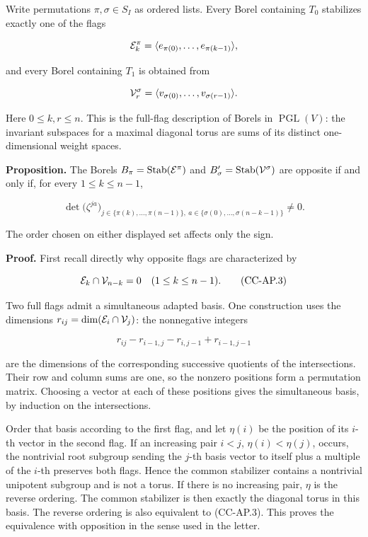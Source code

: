\documentclass[11pt,a4paper]{article}
\theoremstyle{definition}\newtheorem{definition}[theorem]{Definition}
\theoremstyle{remark}\newtheorem{remark}[theorem]{Remark}
\begin{document}
Write permutations \(\pi,\sigma\in S_I\) as ordered lists. Every Borel
containing \(T_0\) stabilizes exactly one of the flags

\[
 {\cal E}^{\pi}_k=\langle e_{\pi(0)},\ldots,e_{\pi(k-1)}\rangle ,
\]

and every Borel containing \(T_1\) is obtained from

\[
 {\cal V}^{\sigma}_r=\langle v_{\sigma(0)},\ldots,v_{\sigma(r-1)}\rangle .
\]

Here \(0\leq k,r\leq n\). This is the full-flag description of Borels in
\(\operatorname{PGL}(V)\): the invariant subspaces for a maximal
diagonal torus are sums of its distinct one-dimensional weight spaces.

\textbf{Proposition.} The Borels
\(B_\pi=\operatorname{Stab}({\cal E}^\pi)\) and
\(B'_\sigma=\operatorname{Stab}({\cal V}^\sigma)\) are opposite if and
only if, for every \(1\leq k\leq n-1\),

\[
 \det\bigl(\zeta^{ja}\bigr)_{
 j\in\{\pi(k),\ldots,\pi(n-1)\},
 \ a\in\{\sigma(0),\ldots,\sigma(n-k-1)\}}\ne0.
 \tag{CC-AP.2}
\]

The order chosen on either displayed set affects only the sign.

\textbf{Proof.} First recall directly why opposite flags are
characterized by

\[
 {\cal E}_k\cap{\cal V}_{n-k}=0
 \quad(1\leq k\leq n-1).
 \tag{CC-AP.3}
\]

Two full flags admit a simultaneous adapted basis. One construction uses
the dimensions \(r_{ij}=\dim({\cal E}_i\cap{\cal V}_j)\): the
nonnegative integers

\[
 r_{ij}-r_{i-1,j}-r_{i,j-1}+r_{i-1,j-1}
\]

are the dimensions of the corresponding successive quotients of the
intersections. Their row and column sums are one, so the nonzero
positions form a permutation matrix. Choosing a vector at each of these
positions gives the simultaneous basis, by induction on the
intersections.

Order that basis according to the first flag, and let \(\eta(i)\) be the
position of its \(i\)-th vector in the second flag. If an increasing
pair \(i<j\), \(\eta(i)<\eta(j)\), occurs, the nontrivial root subgroup
sending the \(j\)-th basis vector to itself plus a multiple of the
\(i\)-th preserves both flags. Hence the common stabilizer contains a
nontrivial unipotent subgroup and is not a torus. If there is no
increasing pair, \(\eta\) is the reverse ordering. The common stabilizer
is then exactly the diagonal torus in this basis. The reverse ordering
is also equivalent to (CC-AP.3). This proves the equivalence with
opposition in the sense used in the letter.
\end{document}
